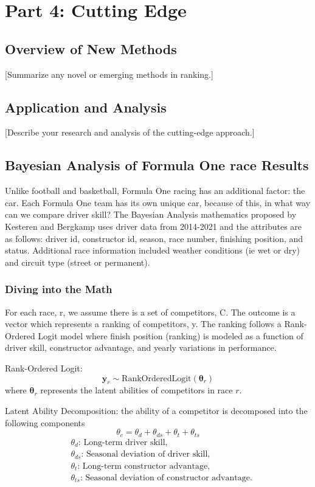 \documentclass[12pt]{article}
\begin{document}
\section{Part 4: Cutting Edge}
\subsection{Overview of New Methods}
[Summarize any novel or emerging methods in ranking.]

\subsection{Application and Analysis}
[Describe your research and analysis of the cutting-edge approach.]

\subsection{Bayesian Analysis of Formula One race Results}
Unlike football and basketball, Formula One racing has an additional factor: the car.
Each Formula One team has its own unique car, because of this, in what way can we compare
driver skill? The Bayesian Analysis mathematics proposed by Kesteren and Bergkamp uses driver data 
from 2014-2021 and the attributes are as follows: driver id, constructor id, season, race number, 
finishing position, and status. Additional race information included weather conditions (ie wet 
or dry) and circuit type (street or permanent).

\subsubsection{Diving into the Math}
For each race, r, we assume there is a set of competitors, C. The outcome is a vector which 
represents a ranking of competitors, y. The ranking follows a Rank-Ordered Logit model where 
finish position (ranking) is modeled as a function of driver skill, constructor advantage, and 
yearly variations in performance.

Rank-Ordered Logit:
\[
\mathbf{y}_r \sim \text{RankOrderedLogit}(\boldsymbol{\theta}_r)
\]
where \(\boldsymbol{\theta}_r\) represents the latent abilities of competitors in race \(r\).

Latent Ability Decomposition: 
the ability of a competitor is decomposed into the following components
\[
\theta_c = \theta_d + \theta_{ds} + \theta_t + \theta_{ts}
\]
\[
\begin{aligned}
&\theta_d \text{: Long-term driver skill,} \\
&\theta_{ds} \text{: Seasonal deviation of driver skill,} \\
&\theta_t \text{: Long-term constructor advantage,} \\
&\theta_{ts} \text{: Seasonal deviation of constructor advantage.}
\end{aligned}
\]
\end{document}
